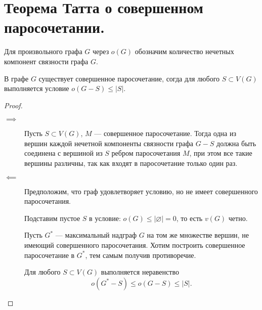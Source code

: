 \section{Теорема Татта о совершенном паросочетании.}
\begin{definition}
    Для произвольного графа $G$ через $o(G)$ обозначим количество нечетных компонент связности графа $G$.
\end{definition}

\begin{theorem}[Татт, 1947]
	В графе $G$ существует совершенное паросочетание, согда для любого $S \subset V(G)$ выполняется условие $o(G-S) \le \lvert S \rvert$.
\end{theorem}
\begin{proof}
    \begin{description}
		\item[$ \implies$ ] Пусть $S \subset V(G)$, $M$ --- совершенное паросочетание. Тогда одна из вершин каждой нечетной компоненты связности графа $G-S$ должна быть соединена с вершиной из $S$ ребром паросочетания $M$, при этом все такие вершины различны, так как входят в паросочетание только один раз.
		\item[$ \impliedby$ ] Предположим, что граф удовлетворяет условию, но не имеет совершенного паросочетания. 

			Подставим пустое $S$ в условие: $o(G) \le \lvert \varnothing \rvert = 0$, то есть $v(G)$ четно.

			Пусть $G^*$ --- максимальный надграф $G$ на том же множестве вершин, не имеющий совершенного паросочетания. Хотим построить совершенное паросочетание в $G^*$, тем самым получив противоречие.

			Для любого $S \subset V(G)$ выполняется неравенство
			\[
			o(G^*-S) \le o(G-S) \le \lvert S \rvert
			.\] 


\end{description}
\end{proof}
